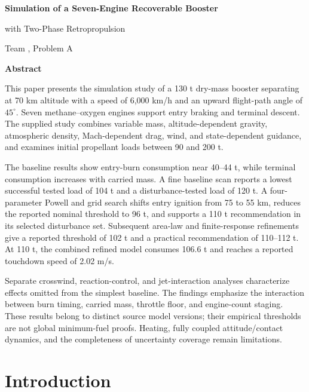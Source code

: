 \documentclass[11pt,a4paper]{article}
\begin{document}
\hypersetup{pageanchor=false}
\begin{center}
\vspace*{6mm}
{\LARGE\bfseries Simulation of a Seven-Engine Recoverable Booster\par with Two-Phase Retropropulsion\par}
\vspace{5mm}
{\large Team \TeamNumber, Problem A\par}
\vspace{6mm}
{\large\bfseries Abstract\par}
\end{center}
\noindent
This paper presents the simulation study of a 130 t dry-mass booster separating at 70 km altitude with a speed of 6,000 km/h and an upward flight-path angle of $45^\circ$. Seven methane--oxygen engines support entry braking and terminal descent. The supplied study combines variable mass, altitude-dependent gravity, atmospheric density, Mach-dependent drag, wind, and state-dependent guidance, and examines initial propellant loads between 90 and 200 t.

The baseline results show entry-burn consumption near 40--44 t, while terminal consumption increases with carried mass. A fine baseline scan reports a lowest successful tested load of 104 t and a disturbance-tested load of 120 t. A four-parameter Powell and grid search shifts entry ignition from 75 to 55 km, reduces the reported nominal threshold to 96 t, and supports a 110 t recommendation in its selected disturbance set. Subsequent area-law and finite-response refinements give a reported threshold of 102 t and a practical recommendation of 110--112 t. At 110 t, the combined refined model consumes 106.6 t and reaches a reported touchdown speed of 2.02 m/s.

Separate crosswind, reaction-control, and jet-interaction analyses characterize effects omitted from the simplest baseline. The findings emphasize the interaction between burn timing, carried mass, throttle floor, and engine-count staging. These results belong to distinct source model versions; their empirical thresholds are not global minimum-fuel proofs. Heating, fully coupled attitude/contact dynamics, and the completeness of uncertainty coverage remain limitations.
\clearpage
\hypersetup{pageanchor=true}
{\small\tableofcontents}
\clearpage
{}

\section{Introduction}
\end{document}
